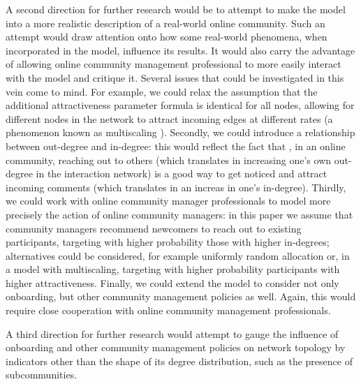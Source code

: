 A second direction for further research would be to attempt to make the model into a more realistic description of a real-world online community. Such an attempt would draw attention onto how some real-world phenomena, when incorporated in the model, influence its results. It would also carry the advantage of allowing online community management professional to more easily interact with the model and critique it. Several issues that could be investigated in this vein come to mind. For example, we could relax the assumption that the additional attractiveness parameter formula is identical for all nodes, allowing for different nodes in the network to attract incoming edges at different rates (a phenomenon known as multiscaling \cite{bianconi2001competition}). Secondly, we could introduce a relationship between out-degree and in-degree: this would reflect the fact that , in an online community, reaching out to others (which translates in increasing one's own out-degree in the interaction network) is a good way to get noticed and attract incoming comments (which translates in an increas in one's in-degree). Thirdly, we could work with online community manager professionals to model more precisely the action of online community managers: in this paper we assume that community managers recommend newcomers to reach out to existing participants, targeting with higher probability those with higher in-degrees; alternatives could be considered, for example uniformly random allocation or, in a model with multiscaling, targeting with higher probability participants with higher attractiveness. Finally, we could extend the model to consider not only onboarding, but other community management policies as well. Again, this would require close cooperation with online community management professionals.

A third direction for further research would attempt to gauge the influence of onboarding and other community management policies on network topology by indicators other than the shape of its degree distribution, such as the presence of subcommunities. 

